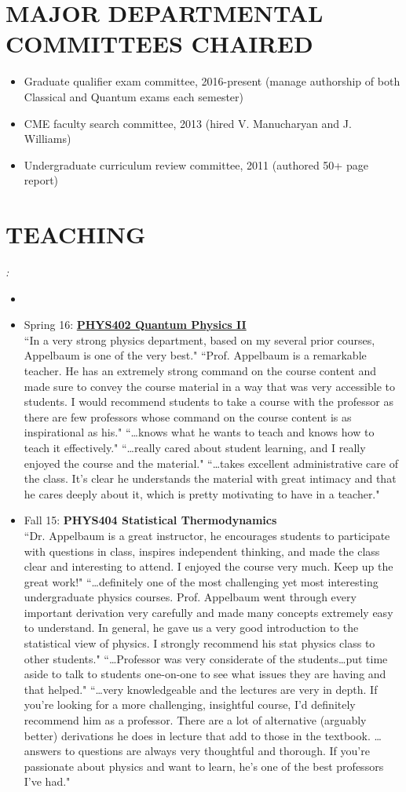 \documentclass[paper=letter,fontsize=11pt]{scrartcl} %
\newcommand{\NewPart}[2]{\section*{\uppercase{#1} #2}}
\newcommand{\CourseEntry}[3]{
		\noindent \item{#1: \textbf{#2} \\ #3}}
\begin{document}
\NewPart{Major Departmental Committees Chaired}{}
\begin{itemize}
\item Graduate qualifier exam committee, 2016-present (manage authorship of both Classical and Quantum exams each semester)
\item CME faculty search committee, 2013 (hired V. Manucharyan and J. Williams)
\item Undergraduate curriculum review committee, 2011 (authored 50+ page report)
\end{itemize}


\NewPart{Teaching}{}
\textit{:}
\begin{itemize}
\item[]
\vspace{-24pt}

\CourseEntry{Spring 16}{\href{http://www.lulu.com/content/paperback-book/quantum-physics/14892135}{PHYS402 Quantum Physics II}}{``In a very strong physics department, based on my several prior courses, Appelbaum is one of the very best." ``Prof. Appelbaum is a remarkable teacher. He has an extremely strong command on the course content and made sure to convey the course material in a way that was very accessible to students. I would recommend students to take a course with the professor as there are few professors whose command on the course content is as inspirational as his." ``\dots knows what he wants to teach and knows how to teach it effectively." ``\dots really cared about student learning, and I really enjoyed the course and the material." ``\dots takes excellent administrative care of the class. It's clear he understands the material with great intimacy and that he cares deeply about it, which is pretty motivating to
have in a teacher."}

\CourseEntry{Fall 15}{PHYS404 Statistical Thermodynamics}{``Dr. Appelbaum is a great instructor, he encourages students to participate with questions in class, inspires independent thinking, and made the class clear and interesting to attend. I enjoyed the course very much. Keep up the great work!" ``\ldots definitely one of the most challenging yet most interesting undergraduate physics courses. Prof. Appelbaum went through every important derivation very carefully and made many concepts extremely easy to understand. In general, he gave us a very good introduction to the statistical view of physics. I strongly recommend his stat physics class to other students." ``\ldots Professor was very considerate of the students\dots put time aside to talk to students one-on-one to see what issues they are having and that helped." ``\ldots very knowledgeable and the lectures are very in depth. If you're looking for a more challenging, insightful course, I'd definitely recommend him as a professor. There are a lot of alternative (arguably better) derivations he does in lecture that add to those in the textbook. \dots answers to questions are always very thoughtful and thorough. If you're passionate about physics and want to learn, he's one of the best professors I've had." }


\end{itemize}
\end{document}
